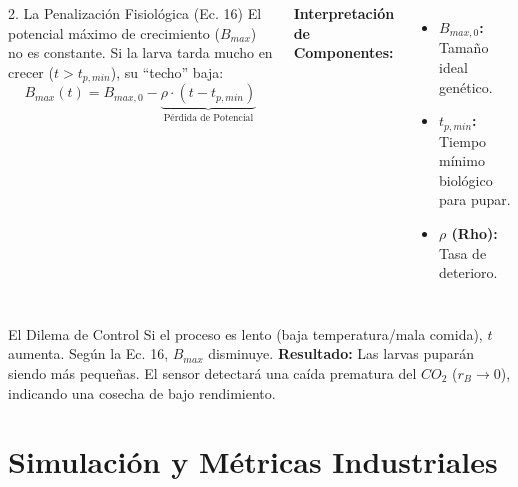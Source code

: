 \documentclass[aspectratio=169, 10pt]{beamer}
\begin{document}
\begin{frame}

    \begin{columns}[T]
        \begin{alertblock}{2. La Penalización Fisiológica (Ec. 16)}
            El potencial máximo de crecimiento ($B_{max}$) no es constante. Si la larva tarda mucho en crecer ($t > t_{p,min}$), su ``techo'' baja:
            $$ B_{max}(t) = B_{max,0} - \underbrace{\rho \cdot (t - t_{p,min})}_{\text{Pérdida de Potencial}} $$
        \end{alertblock}

        \vspace{0.2cm}
        \textbf{Interpretación de Componentes:}
        \begin{itemize}
            \item \textbf{$B_{max,0}$:} Tamaño ideal genético.
            \item \textbf{$t_{p,min}$:} Tiempo mínimo biológico para pupar.
            \item \textbf{$\rho$ (Rho):} Tasa de deterioro.
        \end{itemize}
    \end{columns}

    \vspace{0.3cm}

    \begin{exampleblock}{El Dilema de Control}
        \small
        Si el proceso es lento (baja temperatura/mala comida), $t$ aumenta. Según la Ec. 16, $B_{max}$ disminuye.
        \textbf{Resultado:} Las larvas puparán siendo más pequeñas. El sensor detectará una caída prematura del $CO_2$ ($r_B \to 0$), indicando una cosecha de bajo rendimiento.
    \end{exampleblock}
\end{frame}%
\section{Simulación y Métricas Industriales}
\end{document}
